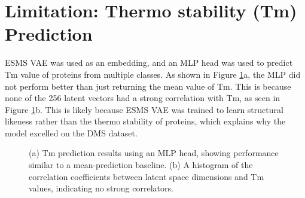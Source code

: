 \documentclass[unnumsec,webpdf,contemporary,medium]{oup-authoring-template}
\begin{document}
\section{Limitation: Thermo stability (Tm) Prediction}\label{sec:Tm_prediction}
ESMS VAE was used as an embedding, and an MLP head was used to predict Tm value of proteins from multiple classes. As shown in Figure \ref{fig:tm_prediction}a, the MLP did not perform better than just returning the mean value of Tm. This is because none of the 256 latent vectors had a strong correlation with Tm, as seen in Figure \ref{fig:tm_prediction}b. This is likely because ESMS VAE was trained to learn structural likeness rather than the thermo stability of proteins, which explains why the model excelled on the DMS dataset.

\begin{figure}[!ht]
    \centering
    \hfill
    \caption{(a) Tm prediction results using an MLP head, showing performance similar to a mean-prediction baseline. (b) A histogram of the correlation coefficients between latent space dimensions and Tm values, indicating no strong correlators.}
    \label{fig:tm_prediction}
\end{figure}
\end{document}
